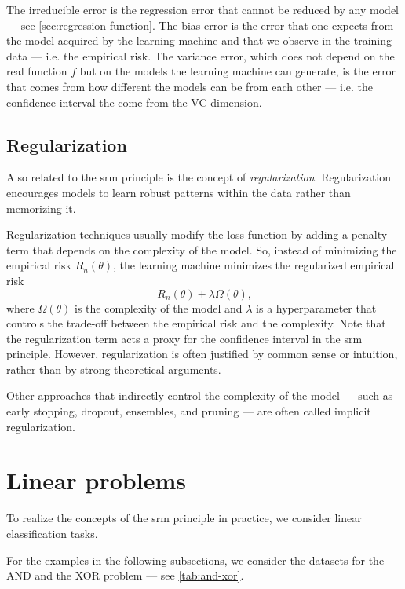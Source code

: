 The irreducible error is the regression error that cannot be reduced by any model --- see
\cref{sec:regression-function}.  The bias error is the error that one expects from the
model acquired by the learning machine and that we observe in the training data --- i.e.
the empirical risk.  The variance error, which does not depend on the real function $f$
but on the models the learning machine can generate, is the error that comes from how
different the models can be from each other --- i.e. the confidence interval the come from
the VC dimension.

\subsection{Regularization}

Also related to the \gls{srm} principle is the concept of \emph{regularization}.
Regularization encourages models to learn robust patterns within the data rather than
memorizing it.

Regularization techniques usually modify the loss function by adding a penalty term that
depends on the complexity of the model.  So, instead of minimizing the empirical risk
$R_n(\theta)$, the learning machine minimizes the regularized empirical risk
\[
  R_n(\theta) + \lambda \Omega(\theta)\text{,}
\]
where $\Omega(\theta)$ is the complexity of the model and $\lambda$ is a hyperparameter
that controls the trade-off between the empirical risk and the complexity.
Note that the regularization term acts a proxy for the confidence interval in the
\gls{srm} principle.  However, regularization is often justified by common sense or
intuition, rather than by strong theoretical arguments.

Other approaches that indirectly control the complexity of the model --- such as early
stopping, dropout, ensembles, and pruning --- are often called implicit regularization.

\section{Linear problems}

To realize the concepts of the \gls{srm} principle in practice, we consider linear
classification tasks.

For the examples in the following subsections, we consider the datasets for the AND
and the XOR problem --- see \cref{tab:and-xor}.

